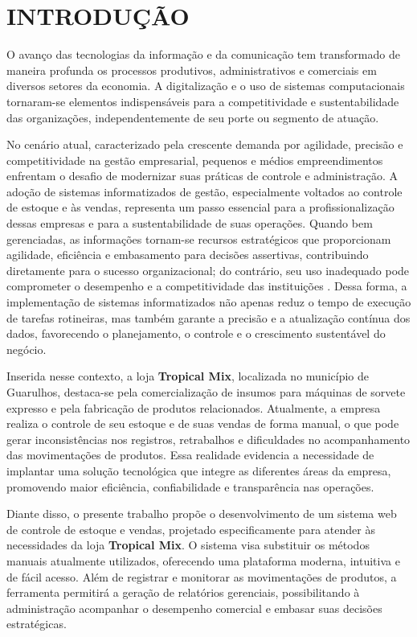 \chapter{INTRODUÇÃO}

O avanço das tecnologias da informação e da comunicação tem transformado de maneira profunda os processos produtivos, administrativos e comerciais em diversos setores da economia. A digitalização e o uso de sistemas computacionais tornaram-se elementos indispensáveis para a competitividade e sustentabilidade das organizações, independentemente de seu porte ou segmento de atuação.

No cenário atual, caracterizado pela crescente demanda por agilidade, precisão e competitividade na gestão empresarial, pequenos e médios empreendimentos enfrentam o desafio de modernizar suas práticas de controle e administração. A adoção de sistemas informatizados de gestão, especialmente voltados ao controle de estoque e às vendas, representa um passo essencial para a profissionalização dessas empresas e para a sustentabilidade de suas operações. Quando bem gerenciadas, as informações tornam-se recursos estratégicos que proporcionam agilidade, eficiência e embasamento para decisões assertivas, contribuindo diretamente para o sucesso organizacional; do contrário, seu uso inadequado pode comprometer o desempenho e a competitividade das instituições \cite{eleuterio2015}. Dessa forma, a implementação de sistemas informatizados não apenas reduz o tempo de execução de tarefas rotineiras, mas também garante a precisão e a atualização contínua dos dados, favorecendo o planejamento, o controle e o crescimento sustentável do negócio.

Inserida nesse contexto, a loja \textbf{Tropical Mix}, localizada no município de Guarulhos, destaca-se pela comercialização de insumos para máquinas de sorvete expresso e pela fabricação de produtos relacionados. Atualmente, a empresa realiza o controle de seu estoque e de suas vendas de forma manual, o que pode gerar inconsistências nos registros, retrabalhos e dificuldades no acompanhamento das movimentações de produtos. Essa realidade evidencia a necessidade de implantar uma solução tecnológica que integre as diferentes áreas da empresa, promovendo maior eficiência, confiabilidade e transparência nas operações.

Diante disso, o presente trabalho propõe o desenvolvimento de um sistema web de controle de estoque e vendas, projetado especificamente para atender às necessidades da loja \textbf{Tropical Mix}. O sistema visa substituir os métodos manuais atualmente utilizados, oferecendo uma plataforma moderna, intuitiva e de fácil acesso. Além de registrar e monitorar as movimentações de produtos, a ferramenta permitirá a geração de relatórios gerenciais, possibilitando à administração acompanhar o desempenho comercial e embasar suas decisões estratégicas.


